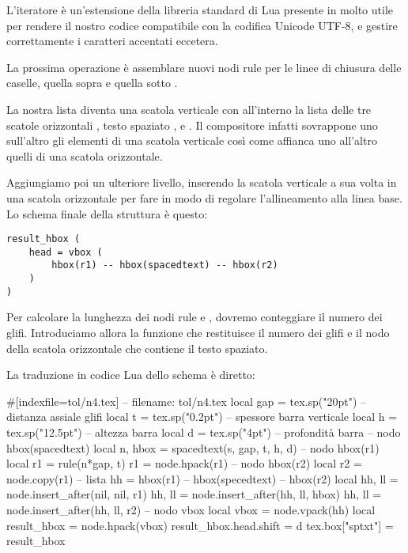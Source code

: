 L'iteratore  è un'estensione della
libreria standard di Lua presente in \LuaTeX{} molto utile per rendere il nostro
codice compatibile con la codifica Unicode UTF-8, e gestire correttamente i
caratteri accentati eccetera.

La prossima operazione è assemblare nuovi nodi rule per le linee di chiusura
delle caselle, quella sopra  e quella sotto .

La nostra lista diventa una scatola verticale con all'interno la lista delle tre
scatole orizzontali , testo spaziato , e
. Il compositore infatti sovrappone uno sull'altro gli elementi di
una scatola verticale così come affianca uno all'altro quelli di una scatola
orizzontale.

Aggiungiamo poi un ulteriore livello, inserendo la scatola verticale a sua volta
in una scatola orizzontale per fare in modo di regolare l'allineamento alla
linea base. Lo schema finale della struttura è questo:
\begin{Verbatim}[numbers=none]
result_hbox (
    head = vbox (
        hbox(r1) -- hbox(spacedtext) -- hbox(r2)
    )
)
\end{Verbatim}

Per calcolare la lunghezza dei nodi rule  e , dovremo
conteggiare il numero dei glifi. Introduciamo allora la funzione 
che restituisce il numero dei glifi e il nodo della scatola orizzontale che
contiene il testo spaziato.

La traduzione in codice Lua dello schema è diretto:
\begin{lines}
#[indexfile=tol/n4.tex]
-- filename: tol/n4.tex
local gap = tex.sp("20pt") -- distanza assiale glifi
local t = tex.sp("0.2pt")  -- spessore barra verticale
local h = tex.sp("12.5pt") -- altezza barra
local d = tex.sp("4pt")    -- profondità barra
-- nodo hbox(spacedtext)
local n, hbox = spacedtext(s, gap, t, h, d)
-- nodo hbox(r1)
local r1 = rule(n*gap, t)
r1 = node.hpack(r1)
-- nodo hbox(r2)
local r2 = node.copy(r1)
-- lista hh = hbox(r1) -- hbox(specedtext) -- hbox(r2)
local hh, ll = node.insert_after(nil, nil, r1)
hh, ll = node.insert_after(hh, ll, hbox)
hh, ll = node.insert_after(hh, ll, r2)
-- nodo vbox
local vbox = node.vpack(hh)
local result_hbox = node.hpack(vbox)
result_hbox.head.shift = d
tex.box["sptxt"] = result_hbox
\end{lines}


